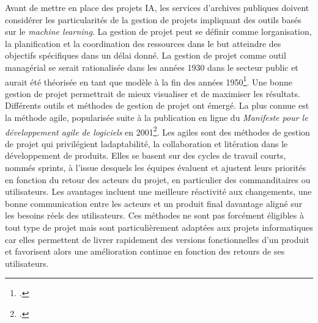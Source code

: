 Avant de mettre en place des projets IA, les services d'archives
publiques doivent considérer les particularités de la gestion de projets
impliquant des outils basés sur le \emph{machine learning}. La gestion
de projet peut se définir comme l\textquotesingle organisation, la
planification et la coordination des ressources dans le but atteindre des
objectifs spécifiques dans un délai donné. La gestion de projet comme
outil managérial se serait rationalisée dans les années 1930 dans le
secteur public et aurait été théorisée en tant que modèle à la fin des
années 1950\footcite{garel_pour_2003}. Une bonne gestion de projet permettrait de mieux visualiser
et de maximiser les résultats. Différents outils et méthodes de gestion de
projet ont émergé. La plus connue est la méthode agile, popularisée
suite à la publication en ligne du \emph{Manifeste pour le développement
	agile de logiciels} en 2001\footcite{noauthor_manifesto_nodate}. Les
\gls{agiles} sont des méthodes de gestion de projet qui privilégient
l\textquotesingle adaptabilité, la collaboration et
l\textquotesingle itération dans le développement de produits. Elles se
basent sur des cycles de travail courts, nommés sprints, à l'issue
desquels les équipes évaluent et ajustent leurs priorités en fonction du
retour des acteurs du projet, en particulier des commanditaires ou
utilisateurs. Les avantages incluent une meilleure réactivité aux
changements, une bonne communication entre les acteurs et un produit
final davantage aligné sur les besoins réels des utilisateurs. 
Ces méthodes ne sont pas forcément éligibles à tout type de projet 
mais sont particulièrement adaptées aux projets informatiques car elles
 permettent de livrer rapidement des versions fonctionnelles d'un 
 produit et favorisent alors une amélioration continue en fonction 
 des retours de ses utilisateurs.


